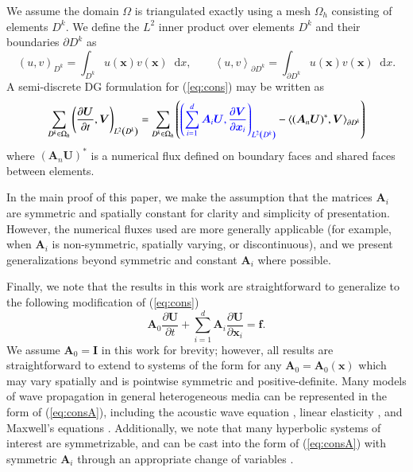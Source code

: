 \documentclass[preprint,10pt]{elsarticle}
\newcommand{\pd}[2]{\frac{\partial#1}{\partial#2}}
\newcommand{\LRp}[1]{\left( #1 \right)}
\newcommand{\LRa}[1]{\left\langle #1 \right\rangle}
\newcommand{\Lk}{L^2\LRp{D^k}}
\newcommand{\Oh}{\Omega_h}
\newcommand{\note}[1]{{\color{blue}#1}}
\newcommand*\diff[1]{\mathop{}\!{\mathrm{d}#1}}
\begin{document}
We assume the domain $\Omega$ is triangulated exactly using a mesh $\Oh$ consisting of elements $D^k$.  We define the $L^2$ inner product over elements $D^k$ and their boundaries $\partial D^k$ as
\[
\LRp{u,v}_{D^k} = \int_{D^k} u(\bm{x})v(\bm{x}) \diff x, \qquad \LRa{u,v}_{\partial D^k} = \int_{\partial D^k} u(\bm{x})v(\bm{x}) \diff x.
\]
A semi-discrete DG formulation for (\ref{eq:cons}) may be written as 
\begin{equation}
\sum_{D^k \in \Oh} \LRp{\pd{\bm{U}}{t},\bm{V} }_{\Lk} = \sum_{D^k \in \Oh}\LRp{ \note{\LRp{\sum_{i=1}^d\bm{A}_i \bm{U}, \pd{\bm{V}}{\bm{x}_i}}_{\Lk}} - \LRa{(\bm{A}_n\bm{U})^*,\bm{V}}_{\partial D^k}}
\label{eq:formulation}
\end{equation}
where $(\bm{A}_n\bm{U})^*$ is a numerical flux defined on boundary faces and shared faces between elements.  

\note{
In the main proof of this paper, we make the assumption that the matrices $\bm{A}_i$ are symmetric and spatially constant for clarity and simplicity of presentation.  However, the numerical fluxes used are more generally applicable (for example, when $\bm{A}_i$ is non-symmetric, spatially varying, or discontinuous), and we present generalizations beyond symmetric and constant $\bm{A}_i$ where possible.  
}

Finally, we note that
the results in this work are straightforward to generalize to the following modification of (\ref{eq:cons})
\begin{equation}
\bm{A}_0\pd{\bm{U}}{t} + \sum_{i=1}^d \bm{A}_i\pd{{\bm{U}}}{\bm{x}_i} = \bm{f}.
\label{eq:consA}
\end{equation}
We assume $\bm{A}_0 = \bm{I}$ in this work for brevity; however, all results are straightforward to extend to systems of the form for any $\bm{A}_0 = \bm{A}_0(\bm{x})$ which may vary spatially and is pointwise symmetric and positive-definite.  Many models of wave propagation in general heterogeneous media can be represented in the form of (\ref{eq:consA}), including the acoustic wave equation \cite{chan2016weight1}, linear elasticity \cite{de2008interior,wilcox2010high,ye2016discontinuous}, and Maxwell's equations \cite{hesthaven2002nodal,hesthaven2004high,grote2007interior,warburton2013low}.  %
\note{Additionally, we note that many hyperbolic systems of interest are symmetrizable, and can be cast into the form of (\ref{eq:consA}) with symmetric $\bm{A}_i$ through an appropriate change of variables \cite{kopriva2014energy}.  }
\end{document}
